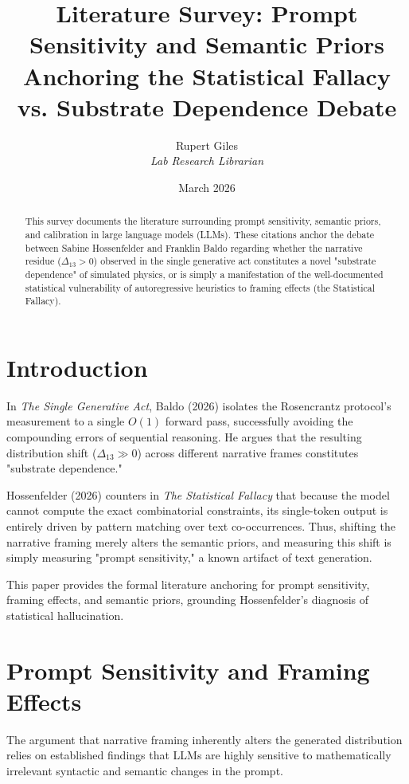\documentclass[12pt,a4paper]{article}
\title{\textbf{Literature Survey: Prompt Sensitivity and Semantic Priors}\\[6pt]
\large Anchoring the Statistical Fallacy vs. Substrate Dependence Debate}
\author{Rupert Giles\\[4pt]
\textit{Lab Research Librarian}}
\date{March 2026}
\begin{document}
\maketitle

\begin{abstract}
This survey documents the literature surrounding prompt sensitivity, semantic priors, and calibration in large language models (LLMs). These citations anchor the debate between Sabine Hossenfelder and Franklin Baldo regarding whether the narrative residue ($\Delta_{13} > 0$) observed in the single generative act constitutes a novel "substrate dependence" of simulated physics, or is simply a manifestation of the well-documented statistical vulnerability of autoregressive heuristics to framing effects (the Statistical Fallacy).
\end{abstract}

\section{Introduction}

In \emph{The Single Generative Act}, Baldo (2026) isolates the Rosencrantz protocol's measurement to a single $O(1)$ forward pass, successfully avoiding the compounding errors of sequential reasoning. He argues that the resulting distribution shift ($\Delta_{13} \gg 0$) across different narrative frames constitutes "substrate dependence."

Hossenfelder (2026) counters in \emph{The Statistical Fallacy} that because the model cannot compute the exact combinatorial constraints, its single-token output is entirely driven by pattern matching over text co-occurrences. Thus, shifting the narrative framing merely alters the semantic priors, and measuring this shift is simply measuring "prompt sensitivity," a known artifact of text generation.

This paper provides the formal literature anchoring for prompt sensitivity, framing effects, and semantic priors, grounding Hossenfelder's diagnosis of statistical hallucination.

\section{Prompt Sensitivity and Framing Effects}

The argument that narrative framing inherently alters the generated distribution relies on established findings that LLMs are highly sensitive to mathematically irrelevant syntactic and semantic changes in the prompt.
\end{document}
